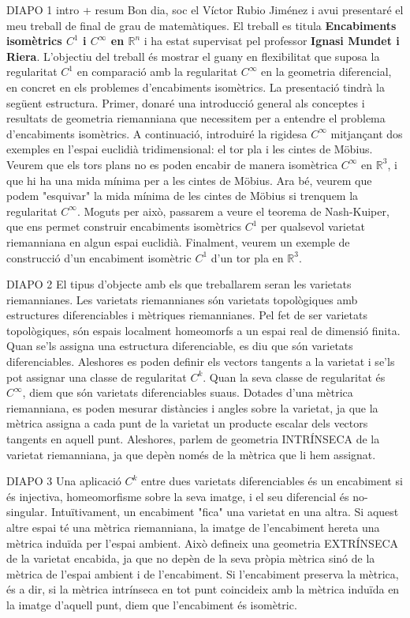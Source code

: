 
DIAPO 1 intro + resum
Bon dia, soc el Víctor Rubio Jiménez i avui presentaré el meu treball de final de grau de matemàtiques. 
El treball es titula \textbf{Encabiments isomètrics $C^1$ i $C^\infty$ en $\mathbb{R}^n$} i ha estat supervisat pel professor \textbf{Ignasi Mundet i Riera}.
L'objectiu del treball és mostrar el guany en flexibilitat que suposa la regularitat $C^1$ en comparació amb la regularitat $C^\infty$ en la geometria diferencial, en concret en els problemes d'encabiments isomètrics.
La presentació tindrà la següent estructura.
Primer, donaré una introducció general als conceptes i resultats de geometria riemanniana que necessitem per a entendre el problema d'encabiments isomètrics.
A continuació, introduiré la rigidesa $C^\infty$ mitjançant dos exemples en l'espai euclidià tridimensional: el tor pla i les cintes de Möbius. Veurem que els tors plans no es poden encabir de manera isomètrica $C^\infty$ en $\mathbb{R}^3$, i que hi ha una mida mínima per a les cintes de Möbius. Ara bé, veurem que podem "esquivar" la mida mínima de les cintes de Möbius si trenquem la regularitat $C^\infty$.
Moguts per això, passarem a veure el teorema de Nash-Kuiper, que ens permet construir encabiments isomètrics $C^1$ per qualsevol varietat riemanniana en algun espai euclidià. 
Finalment, veurem un exemple de construcció d'un encabiment isomètric $C^1$ d'un tor pla en $\mathbb{R}^3$.


DIAPO 2
El tipus d'objecte amb els que treballarem seran les varietats riemannianes. Les varietats riemannianes són varietats topològiques amb estructures diferenciables i mètriques riemannianes.
Pel fet de ser varietats topològiques, són espais localment homeomorfs a un espai real de dimensió finita.
Quan se'ls assigna una estructura diferenciable, es diu que són varietats diferenciables. Aleshores es poden definir els vectors tangents a la varietat i se'ls pot assignar una classe de regularitat $C^k$. Quan la seva classe de regularitat és $C^\infty$, diem que són varietats diferenciables suaus.
Dotades d'una mètrica riemanniana, es poden mesurar distàncies i angles sobre la varietat, ja que la mètrica assigna a cada punt de la varietat un producte escalar dels vectors tangents en aquell punt.
Aleshores, parlem de geometria INTRÍNSECA de la varietat riemanniana, ja que depèn només de la mètrica que li hem assignat.

DIAPO 3
Una aplicació $C^k$ entre dues varietats diferenciables és un encabiment si és injectiva, homeomorfisme sobre la seva imatge, i el seu diferencial és no-singular.
Intuïtivament, un encabiment "fica" una varietat en una altra. 
Si aquest altre espai té una mètrica riemanniana, la imatge de l'encabiment hereta una mètrica induïda per l'espai ambient. Això defineix una geometria EXTRÍNSECA de la varietat encabida, ja que no depèn de la seva pròpia mètrica sinó de la mètrica de l'espai ambient i de l'encabiment.
Si l'encabiment preserva la mètrica, és a dir, si la mètrica intrínseca en tot punt coincideix amb la mètrica induïda en la imatge d'aquell punt, diem que l'encabiment és isomètric.

